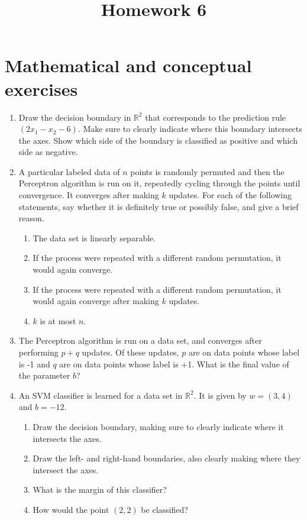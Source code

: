 \documentclass{article}
\title{Homework 6}
\author{}
\date{}
\begin{document}
\maketitle

\section*{Mathematical and conceptual exercises}

\begin{enumerate}
    \item Draw the decision boundary in $\mathbb{R}^{2}$ that corresponds to the prediction rule $\left(2 x_{1}-x_{2}-6\right)$. Make sure to clearly indicate where this boundary intersects the axes. Show which side of the boundary is classified as positive and which side as negative.

    \item A particular labeled data of $n$ points is randomly permuted and then the Perceptron algorithm is run on it, repeatedly cycling through the points until convergence. It converges after making $k$ updates. For each of the following statements, say whether it is definitely true or possibly false, and give a brief reason.
    \begin{enumerate}
        \item The data set is linearly separable.
        \item If the process were repeated with a different random permutation, it would again converge.
        \item If the process were repeated with a different random permutation, it would again converge after making $k$ updates.
        \item $k$ is at most $n$.
    \end{enumerate}

    \item The Perceptron algorithm is run on a data set, and converges after performing $p+q$ updates. Of these updates, $p$ are on data points whose label is -1 and $q$ are on data points whose label is +1. What is the final value of the parameter $b$?

    \item An SVM classifier is learned for a data set in $\mathbb{R}^{2}$. It is given by $w=(3,4)$ and $b=-12$.
    \begin{enumerate}
        \item Draw the decision boundary, making sure to clearly indicate where it intersects the axes.
        \item Draw the left- and right-hand boundaries, also clearly making where they intersect the axes.
        \item What is the margin of this classifier?
        \item How would the point $(2,2)$ be classified?
    \end{enumerate}


\end{enumerate}
\end{document}
